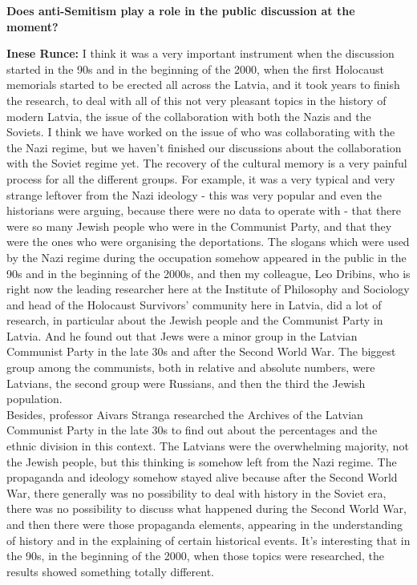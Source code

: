 \textbf{Does anti-Semitism play a role in the public discussion at the moment?}

\textbf{Inese Runce:} I think it was a very important instrument when the discussion started in the 90s and in the beginning of the 2000, when the first Holocaust memorials started to be erected all across the Latvia, and it took years to finish the research, to deal with all of this not very pleasant topics in the history of modern Latvia, the issue of the collaboration with both the Nazis and the Soviets. I think we have worked on the issue of who was collaborating with the the Nazi regime, but we haven’t finished our discussions about the collaboration with the Soviet regime yet.
The recovery of the cultural memory is a very painful process for all the different groups. For example, it was a very typical and very strange leftover from the Nazi ideology - this was very popular and even the historians were arguing, because there were no data to operate with - that there were so many Jewish people who were in the Communist Party, and that they were the ones who were organising the deportations. The slogans which were used by the Nazi regime  during the occupation somehow appeared in the public in the 90s and in the beginning of the 2000s, and then my colleague, Leo Dribins, who is right now the leading researcher here at the Institute of Philosophy and Sociology and head of the Holocaust Survivors' community here in Latvia, did a lot of research, in particular about the Jewish people and the Communist Party in Latvia. And he found out that Jews were a minor group in the Latvian Communist Party in the late 30s and after the Second World War. The biggest group among the communists, both in relative and absolute numbers, were Latvians, the second group were Russians, and then the third the Jewish population.\\
Besides, professor Aivars Stranga researched the Archives of the Latvian Communist Party in the late 30s to find out about the percentages and the ethnic division in this context. The Latvians were the overwhelming majority, not the Jewish people, but this thinking is somehow left from the Nazi regime. The propaganda and ideology somehow stayed alive because after the Second World War, there generally was no possibility to deal with history in the Soviet era, there was no possibility to discuss what happened during the Second World War, and then there were those propaganda elements, appearing in the understanding of history and in the explaining of certain historical events. It's interesting that in the 90s, in the beginning of the 2000, when those topics were researched, the results showed something totally different.

